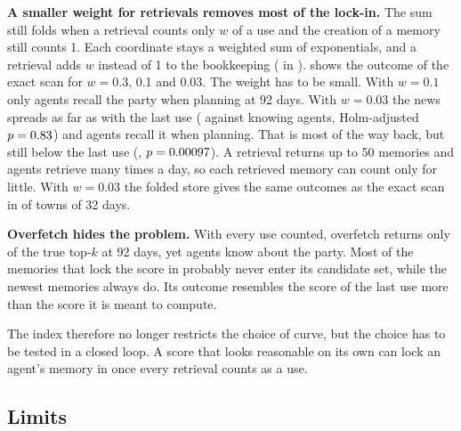 \textbf{A smaller weight for retrievals removes most of the lock-in.} The sum still folds when a retrieval counts only $w$ of a use and the creation of a memory still counts 1. Each coordinate stays a weighted sum of exponentials, and a retrieval adds $w$ instead of 1 to the bookkeeping ( in ).  shows the outcome of the exact scan for $w=0.3$, 0.1 and 0.03. The weight has to be small. With $w=0.1$ only \TrWOneNinetyRecalled{} agents recall the party when planning at 92 days. With $w=0.03$ the news spreads as far as with the last use (\TrWThreeHundredthNinetyAware{} against \TcNinetyLastExAware{} knowing agents, Holm-adjusted $p=0.83{}$) and \TrWThreeHundredthNinetyRecalled{} agents recall it when planning. That is most of the way back, but still below the last use (\TcNinetyLastExRecalled{}, $p=0.00097{}$). A retrieval returns up to 50 memories and agents retrieve many times a day, so each retrieved memory can count only for little. With $w=0.03$ the folded store gives the same outcomes as the exact scan in \TrFoSame{} of \TrFoSeeds{} towns of 32 days.

\begin{table}[t]
\centering\small

\caption{Exact scan with ACT-R's curve summed over every use, when a retrieval counts $w$ of a use and the creation of a memory counts 1. The first row is the curve of the last use only. Mean $\pm$ 95\% confidence interval over 30 seeds of the number of agents (of 25) who knew about the party, recalled it when planning and attended.}
\label{tab:curvesretw}
\end{table}

\textbf{Overfetch hides the problem.} With every use counted, overfetch returns only \TcNinetyUsesReRecall{} of the true top-$k$ at 92 days, yet \TcNinetyUsesReAware{} agents know about the party. Most of the memories that lock the score in probably never enter its candidate set, while the newest memories always do. Its outcome resembles the score of the last use more than the score it is meant to compute.

The index therefore no longer restricts the choice of curve, but the choice has to be tested in a closed loop. A score that looks reasonable on its own can lock an agent's memory in once every retrieval counts as a use.


\subsection{Limits}
\label{sec:curvelimits}

